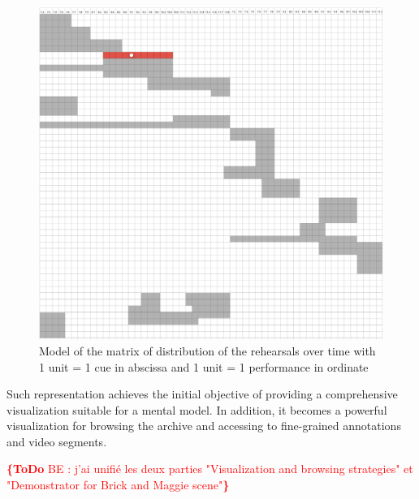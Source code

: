 \documentclass[conference]{IEEEtran}
\newcommand{\todo}[1]{\noindent\textcolor{red}{{\bf \{ToDo} #1{\bf \}}}}
\begin{document}
\begin{figure}[htb!]
  \centering
  \includegraphics[width=0.75\columnwidth]{fullmatrix}
  \caption{Model of the matrix of distribution of the rehearsals over time with 1 unit = 1 cue in abscissa and 1 unit = 1 performance in ordinate}
  \label{fig:fullmatrix}
\end{figure}

Such representation achieves the initial objective of providing a comprehensive visualization suitable for a mental model. In addition, it becomes a powerful visualization for browsing the archive and accessing to fine-grained annotations and video segments.

\todo{BE : j'ai unifié les deux parties "Visualization and browsing strategies" et "Demonstrator for Brick and Maggie scene"}
\end{document}
